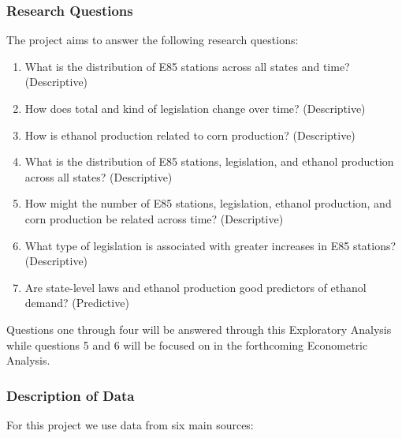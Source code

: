 \documentclass[
]{article}
\begin{document}
\hypertarget{research-questions}{%
\subsubsection{Research Questions}\label{research-questions}}

The project aims to answer the following research questions:

\begin{enumerate}
\def\labelenumi{\arabic{enumi}.}
\item
  What is the distribution of E85 stations across all states and time?
  (Descriptive)
\item
  How does total and kind of legislation change over time? (Descriptive)
\item
  How is ethanol production related to corn production? (Descriptive)
\item
  What is the distribution of E85 stations, legislation, and ethanol
  production across all states? (Descriptive)
\item
  How might the number of E85 stations, legislation, ethanol production,
  and corn production be related across time? (Descriptive)
\item
  What type of legislation is associated with greater increases in E85
  stations? (Descriptive)
\item
  Are state-level laws and ethanol production good predictors of ethanol
  demand? (Predictive)
\end{enumerate}

Questions one through four will be answered through this Exploratory
Analysis while questions 5 and 6 will be focused on in the forthcoming
Econometric Analysis.

\hypertarget{description-of-data}{%
\subsubsection{Description of Data}\label{description-of-data}}

For this project we use data from six main sources:
\end{document}
